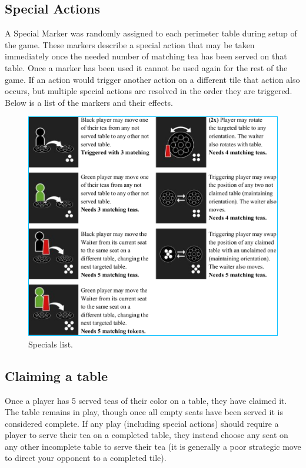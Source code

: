 \documentclass[a4paper]{article}
\begin{document}
\subsection{Special​ ​Actions}
A Special Marker was randomly assigned to each perimeter table during setup of the
game. These markers describe a special action that may be taken immediately once the needed
number of matching tea has been served on that table. Once a marker has been used it cannot be
used again for the rest of the game. If an action would trigger another action on a different tile
that action also occurs, but multiple special actions are resolved in the order they are triggered.
Below is a list of the markers and their effects.


\begin{figure}[H]
\centering
{}
  \includegraphics[width=\linewidth]{specials.png}
  \caption{Specials list.}\label{fig:specials}
\endminipage\hfill

\end{figure}

\subsection{Claiming a table}
Once a player has 5 served teas of their color on a table, they have claimed it. The table
remains in play, though once all empty seats have been served it is considered complete. If any
play (including special actions) should require a player to serve their tea on a completed table,
they instead choose any seat on any other incomplete table to serve their tea (it is generally a
poor strategic move to direct your opponent to a completed tile).
\end{document}
